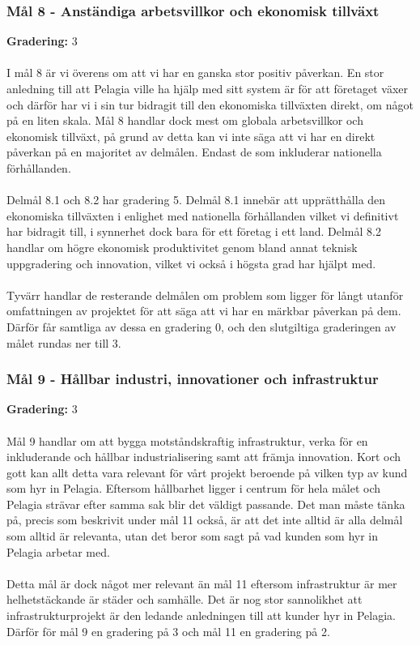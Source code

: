 \subsubsection{Mål 8 - Anständiga arbetsvillkor och ekonomisk tillväxt}
\textbf{Gradering:} 3 
\\\\
I mål 8 är vi överens om att vi har en ganska stor positiv påverkan. En stor anledning till att Pelagia ville ha hjälp med sitt system är för att företaget växer och därför har vi i sin tur bidragit till den ekonomiska tillväxten direkt, om något på en liten skala. Mål 8 handlar dock mest om globala arbetsvillkor och ekonomisk tillväxt, på grund av detta kan vi inte säga att vi har en direkt påverkan på en majoritet av delmålen. Endast de som inkluderar nationella förhållanden.
\\\\
Delmål 8.1 och 8.2 har gradering 5. Delmål 8.1 innebär att upprätthålla den ekonomiska tillväxten i enlighet med nationella förhållanden vilket vi definitivt har bidragit till, i synnerhet dock bara för ett företag i ett land. Delmål 8.2 handlar om högre ekonomisk produktivitet genom bland annat teknisk uppgradering och innovation, vilket vi också i högsta grad har hjälpt med.
\\\\
Tyvärr handlar de resterande delmålen om problem som ligger för långt utanför omfattningen av projektet för att säga att vi har en märkbar påverkan på dem. Därför får samtliga av dessa en gradering 0, och den slutgiltiga graderingen av målet rundas ner till 3.

\subsubsection{Mål 9 - Hållbar industri, innovationer och infrastruktur}
\textbf{Gradering:} 3 
\\\\
Mål 9 handlar om att bygga motståndskraftig infrastruktur, verka för en inkluderande och hållbar industrialisering samt att främja innovation. Kort och gott kan allt detta vara relevant för vårt projekt beroende på vilken typ av kund som hyr in Pelagia. Eftersom hållbarhet ligger i centrum för hela målet och Pelagia strävar efter samma sak blir det väldigt passande. Det man måste tänka på, precis som beskrivit under mål 11 också, är att det inte alltid är alla delmål som alltid är relevanta, utan det beror som sagt på vad kunden som hyr in Pelagia arbetar med.
\\\\
Detta mål är dock något mer relevant än mål 11 eftersom infrastruktur är mer helhetstäckande är städer och samhälle. Det är nog stor sannolikhet att infrastrukturprojekt är den ledande anledningen till att kunder hyr in Pelagia. Därför för mål 9 en gradering på 3 och mål 11 en gradering på 2.

